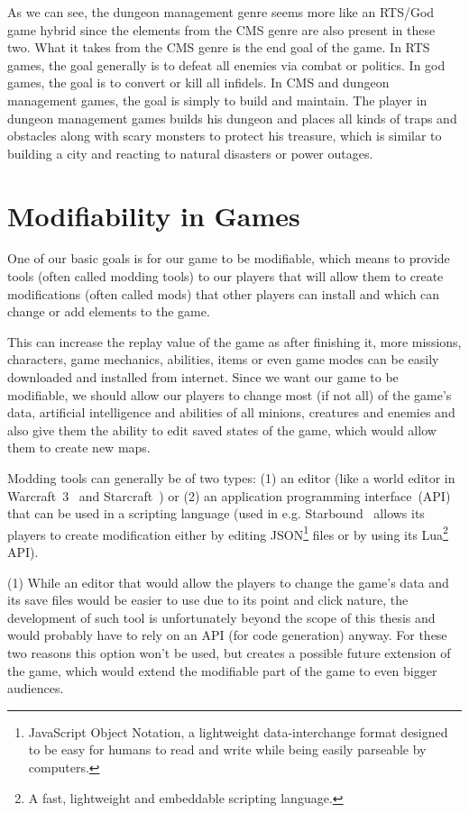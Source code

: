 As we can see, the dungeon management genre seems more like an RTS/God game hybrid since the elements from the CMS genre are also present in these two.
What it takes from the CMS genre is the end goal of the game. In RTS games, the goal generally is to defeat all enemies via combat or politics.
In god games, the goal is to convert or kill all infidels. In CMS and dungeon management games, the goal is simply to build and maintain. The player in dungeon
management games builds his dungeon and places all kinds of traps and obstacles along with scary monsters to protect his treasure, which is similar to building
a city and reacting to natural disasters or power outages.

\section{Modifiability in Games}

One of our basic goals is for our game to be modifiable, which means to provide tools (often called modding tools) to our players
that will allow them to create modifications (often called mods) that other players can install and which can change or
add elements to the game.

This can increase the replay value of the game as after finishing it, more missions, characters, game mechanics, abilities, items
or even game modes can be easily downloaded and installed from internet. Since we want our game to be modifiable, we should allow our players
to change most (if not all) of the game's data, artificial intelligence and abilities of all minions, creatures and enemies and also give
them the ability to edit saved states of the game, which would allow them to create new maps.

Modding tools can generally be of two types: (1) an editor (like a world editor in Warcraft~3~\cite{WC3} and
Starcraft~\cite{SC}) or (2) an application programming interface~(API) that can be used in a scripting language 
(used in e.g. Starbound~\cite{Starbound} allows its players to create modification either by editing 
JSON\footnote{JavaScript Object Notation, a lightweight data-interchange
format designed to be easy for humans to read and write while being easily parseable by computers.\cite{JSON}} files or by using its
Lua\footnote{A fast, lightweight and embeddable scripting language.\cite{Lua}} API).

(1) While an editor that would allow the players to change the game's data and its save files would be easier to use due to its
point and click nature, the development of such tool is unfortunately beyond the scope of this thesis and would probably have to rely
on an API (for code generation) anyway. For these two reasons this option won't be used, but creates a possible future extension of the game,
which would extend the modifiable part of the game to even bigger audiences.

